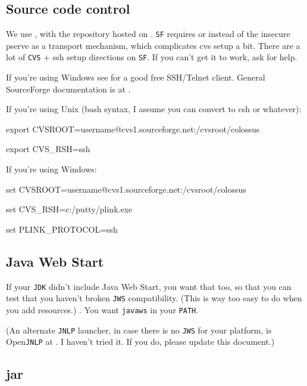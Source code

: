 \documentclass{article}
\begin{document}
\subsection{Source code control}

We use , with the repository 
hosted on .
\texttt{SF} requires  or
 instead of the insecure pserve
as a transport mechanism, which complicates cvs setup a bit. There are a
lot of \texttt{CVS} + ssh setup directions on \texttt{SF}. If you can't
get it to work, ask for help.

If you're using Windows see  for a good free 
SSH/Telnet client. General SourceForge documentation is at 
.


If you're using Unix (bash syntax, I assume you can convert to csh or whatever):

export CVSROOT=username@cvs1.sourceforge.net:/cvsroot/colossus

export CVS\_RSH=ssh

If you're using Windows:

set CVSROOT=username@cvs1.sourceforge.net:/cvsroot/colossus

set CVS\_RSH=c:/putty/plink.exe

set PLINK\_PROTOCOL=ssh

\subsection{Java Web Start}

If your \texttt{JDK} didn't include Java Web Start, you want that too, so 
that you can test that you haven't broken \texttt{JWS} compatibility. (This
is way too easy to do when you add resources.)
. You want \texttt{javaws} in your
\texttt{PATH}.

(An alternate \texttt{JNLP} launcher, in case there is no \texttt{JWS} for
your platform, is Open\texttt{JNLP} at
.
I haven't tried it. If you do, please update this document.)

\subsection{jar}
\end{document}
